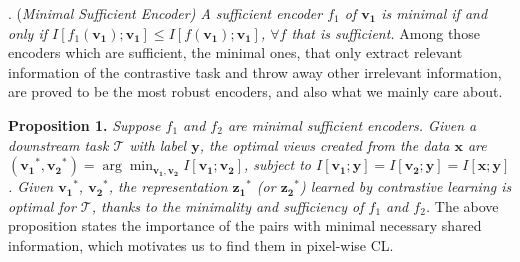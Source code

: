 \documentclass[10pt,twocolumn,letterpaper]{article}
\begin{document}
. {(\it Minimal Sufficient Encoder) A sufficient encoder $f_1$ of $\mathbf{v_1}$ is minimal if and only if $I[f_1(\mathbf{v_1}); \mathbf{v_1}] \leq I[f(\mathbf{v_1}); \mathbf{v_1}]$, $\forall f$ that is sufficient.} 
Among those encoders which are sufficient, the minimal ones, that only extract relevant information of the contrastive task and throw away other irrelevant information, are proved to be the most robust encoders, and also what we mainly care about.
%

\noindent\textbf{Proposition 1.} \textit{Suppose $f_1$ and $f_2$ are minimal sufficient encoders. Given a downstream task $\mathcal{T}$ with label $\mathbf{y}$, the optimal views created from the data $\mathbf{x}$ are $(\mathbf{v_1}^*, \mathbf{v_2}^*) = \arg\min_{\mathbf{v_1}, \mathbf{v_2}} I[\mathbf{v_1};\mathbf{v_2}]$, subject to $I[\mathbf{v_1}; \mathbf{y}]=I[\mathbf{v_2};\mathbf{y}]=I[\mathbf{x};\mathbf{y}]$. Given $\mathbf{v_1}^*$, $\mathbf{v_2}^*$, the representation $\mathbf{z_1}^*$ (or $\mathbf{z_2}^*$) learned by contrastive learning is optimal for $\mathcal{T}$, thanks to the minimality and sufficiency of $f_1$ and $f_2$.}
The above proposition states the importance of the pairs with minimal necessary shared information, which motivates us to find them in pixel-wise CL.
\end{document}
